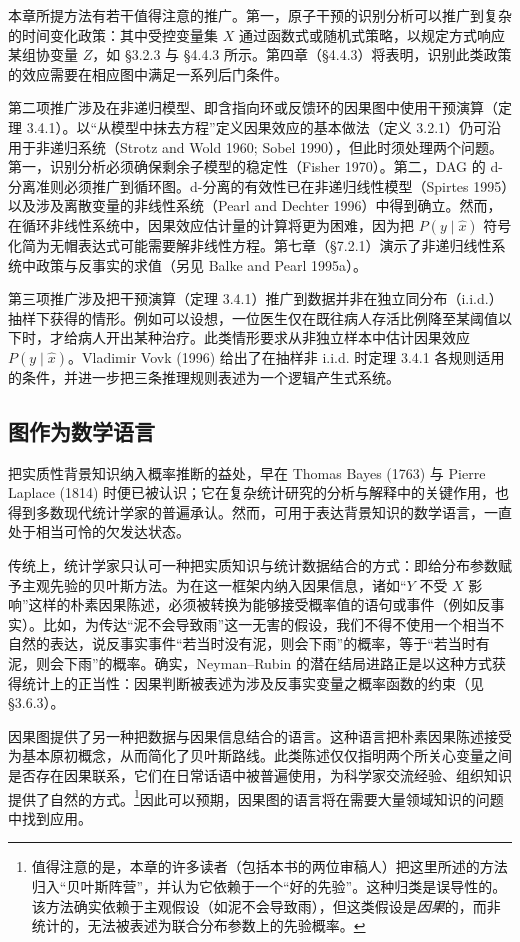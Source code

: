 本章所提方法有若干值得注意的推广。第一，原子干预的识别分析可以推广到复杂的时间变化政策：其中受控变量集 $X$ 通过函数式或随机式策略，以规定方式响应某组协变量 $Z$，如 \S 3.2.3 与 \S 4.4.3 所示。第四章（\S 4.4.3）将表明，识别此类政策的效应需要在相应图中满足一系列后门条件。

第二项推广涉及在非递归模型、即含指向环或反馈环的因果图中使用干预演算（定理 3.4.1）。以“从模型中抹去方程”定义因果效应的基本做法（定义 3.2.1）仍可沿用于非递归系统（Strotz and Wold 1960; Sobel 1990），但此时须处理两个问题。第一，识别分析必须确保剩余子模型的稳定性（Fisher 1970）。第二，DAG 的 d-分离准则必须推广到循环图。d-分离的有效性已在非递归线性模型（Spirtes 1995）以及涉及离散变量的非线性系统（Pearl and Dechter 1996）中得到确立。然而，在循环非线性系统中，因果效应估计量的计算将更为困难，因为把 $P(y\mid\hat{x})$ 符号化简为无帽表达式可能需要解非线性方程。第七章（\S 7.2.1）演示了非递归线性系统中政策与反事实的求值（另见 Balke and Pearl 1995a）。

第三项推广涉及把干预演算（定理 3.4.1）推广到数据并非在独立同分布（i.i.d.）抽样下获得的情形。例如可以设想，一位医生仅在既往病人存活比例降至某阈值以下时，才给病人开出某种治疗。此类情形要求从非独立样本中估计因果效应 $P(y\mid\hat{x})$。Vladimir Vovk (1996) 给出了在抽样非 i.i.d. 时定理 3.4.1 各规则适用的条件，并进一步把三条推理规则表述为一个逻辑产生式系统。

\subsection{图作为数学语言}

把实质性背景知识纳入概率推断的益处，早在 Thomas Bayes (1763) 与 Pierre Laplace (1814) 时便已被认识；它在复杂统计研究的分析与解释中的关键作用，也得到多数现代统计学家的普遍承认。然而，可用于表达背景知识的数学语言，一直处于相当可怜的欠发达状态。

传统上，统计学家只认可一种把实质知识与统计数据结合的方式：即给分布参数赋予主观先验的贝叶斯方法。为在这一框架内纳入因果信息，诸如“$Y$ 不受 $X$ 影响”这样的朴素因果陈述，必须被转换为能够接受概率值的语句或事件（例如反事实）。比如，为传达“泥不会导致雨”这一无害的假设，我们不得不使用一个相当不自然的表达，说反事实事件“若当时没有泥，则会下雨”的概率，等于“若当时有泥，则会下雨”的概率。确实，Neyman–Rubin 的潜在结局进路正是以这种方式获得统计上的正当性：因果判断被表述为涉及反事实变量之概率函数的约束（见 \S 3.6.3）。

因果图提供了另一种把数据与因果信息结合的语言。这种语言把朴素因果陈述接受为基本原初概念，从而简化了贝叶斯路线。此类陈述仅仅指明两个所关心变量之间是否存在因果联系，它们在日常话语中被普遍使用，为科学家交流经验、组织知识提供了自然的方式。\footnote{值得注意的是，本章的许多读者（包括本书的两位审稿人）把这里所述的方法归入“贝叶斯阵营”，并认为它依赖于一个“好的先验”。这种归类是误导性的。该方法确实依赖于主观假设（如泥不会导致雨），但这类假设是\emph{因果}的，而非统计的，无法被表述为联合分布参数上的先验概率。}因此可以预期，因果图的语言将在需要大量领域知识的问题中找到应用。

